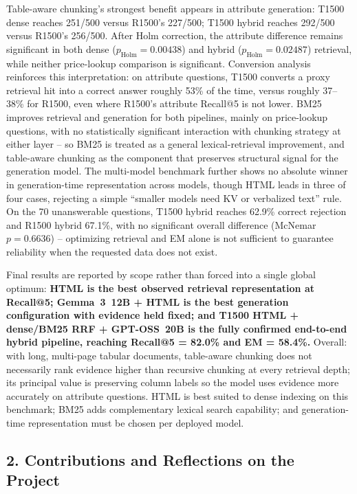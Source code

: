 \documentclass[11pt,a4paper]{article}
\begin{document}
Table-aware chunking's strongest benefit appears in attribute generation:
T1500 dense reaches 251/500 versus R1500's 227/500; T1500 hybrid reaches
292/500 versus R1500's 256/500. After Holm correction, the attribute
difference remains significant in both dense ($p_{\text{Holm}}=0.00438$)
and hybrid ($p_{\text{Holm}}=0.02487$) retrieval, while neither price-lookup
comparison is significant. Conversion analysis reinforces this
interpretation: on attribute questions, T1500 converts a proxy retrieval hit
into a correct answer roughly 53\% of the time, versus roughly 37--38\% for
R1500, even where R1500's attribute Recall@5 is not lower. BM25 improves
retrieval and generation for both pipelines, mainly on price-lookup
questions, with no statistically significant interaction with chunking
strategy at either layer -- so BM25 is treated as a general lexical-retrieval
improvement, and table-aware chunking as the component that preserves
structural signal for the generation model. The multi-model benchmark
further shows no absolute winner in generation-time representation across
models, though HTML leads in three of four cases, rejecting a simple
``smaller models need KV or verbalized text'' rule. On the 70 unanswerable
questions, T1500 hybrid reaches 62.9\% correct rejection and R1500 hybrid
67.1\%, with no significant overall difference (McNemar $p=0.6636$) --
optimizing retrieval and EM alone is not sufficient to guarantee reliability
when the requested data does not exist.

Final results are reported by scope rather than forced into a single global
optimum: \textbf{HTML is the best observed retrieval representation at
Recall@5; Gemma~3~12B + HTML is the best generation configuration with
evidence held fixed; and T1500 HTML + dense/BM25 RRF + GPT-OSS~20B is the
fully confirmed end-to-end hybrid pipeline, reaching Recall@5 = 82.0\% and
EM = 58.4\%.} Overall: with long, multi-page tabular documents, table-aware
chunking does not necessarily rank evidence higher than recursive chunking
at every retrieval depth; its principal value is preserving column labels
so the model uses evidence more accurately on attribute questions. HTML is
best suited to dense indexing on this benchmark; BM25 adds complementary
lexical search capability; and generation-time representation must be
chosen per deployed model.

\subsection{2. Contributions and Reflections on the Project}
\end{document}
